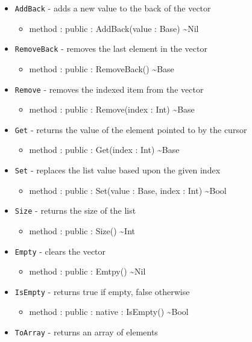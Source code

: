 \documentclass[11pt]{article}
\begin{document}
\begin{itemize}
\item \texttt{AddBack} - adds a new value to the back of the vector
  \begin{itemize}
  \item method : public : AddBack(value : Base) \textasciitilde Nil
  \end{itemize}
\item \texttt{RemoveBack} - removes the last element in the vector
  \begin{itemize}
  \item method : public : RemoveBack() \textasciitilde Base
  \end{itemize}
\item \texttt{Remove} - removes the indexed item from the vector
  \begin{itemize}
  \item method : public : Remove(index : Int) \textasciitilde Base
  \end{itemize}
\item \texttt{Get} - returns the value of the element pointed to by
  the cursor
  \begin{itemize}
  \item method : public : Get(index : Int) \textasciitilde Base
  \end{itemize}
\item \texttt{Set} - replaces the list value based upon the given
  index
  \begin{itemize}
  \item method : public : Set(value : Base, index : Int)
    \textasciitilde Bool
  \end{itemize}
\item \texttt{Size} - returns the size of the list
  \begin{itemize}
  \item method : public : Size() \textasciitilde Int
  \end{itemize}
\item \texttt{Empty} - clears the vector
  \begin{itemize}
  \item method : public : Emtpy() \textasciitilde Nil
  \end{itemize}
\item \texttt{IsEmpty} - returns true if empty, false otherwise
  \begin{itemize}
  \item method : public : native : IsEmpty() \textasciitilde Bool
  \end{itemize}
\item \texttt{ToArray} - returns an array of elements

\end{itemize}
\end{document}
